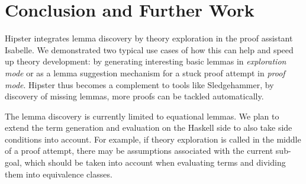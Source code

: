 \section{Conclusion and Further Work}
\label{sec:concl}

Hipster integrates lemma discovery by theory exploration in the proof assistant Isabelle. We demonstrated two typical use cases of how this can help and speed up theory development: by generating interesting basic lemmas in \emph{exploration mode} or as a lemma suggestion mechanism for a stuck proof attempt in \emph{proof mode}. Hipster thus becomes a complement to tools like Sledgehammer, by discovery of missing lemmas, more proofs can be tackled automatically. 

The lemma discovery is currently limited to equational lemmas. We plan to extend the term generation and evaluation on the Haskell side to also take side conditions into account. For example, if theory exploration is called in the middle of a proof attempt, there may be assumptions associated with the current sub-goal, which should be taken into account when evaluating terms and dividing them into equivalence classes. 


